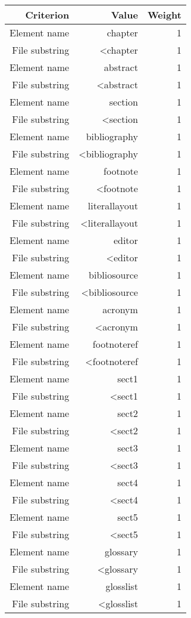 \begin{tabular}{|r|r|r|}
\hline
\bf Criterion&\bf Value&\bf Weight\\
\hline
Element name&chapter&1\\
\hline
File substring&<chapter&1\\
\hline
Element name&abstract&1\\
\hline
File substring&<abstract&1\\
\hline
Element name&section&1\\
\hline
File substring&<section&1\\
\hline
Element name&bibliography&1\\
\hline
File substring&<bibliography&1\\
\hline
Element name&footnote&1\\
\hline
File substring&<footnote&1\\
\hline
Element name&literallayout&1\\
\hline
File substring&<literallayout&1\\
\hline
Element name&editor&1\\
\hline
File substring&<editor&1\\
\hline
Element name&bibliosource&1\\
\hline
File substring&<bibliosource&1\\
\hline
Element name&acronym&1\\
\hline
File substring&<acronym&1\\
\hline
Element name&footnoteref&1\\
\hline
File substring&<footnoteref&1\\
\hline
Element name&sect1&1\\
\hline
File substring&<sect1&1\\
\hline
Element name&sect2&1\\
\hline
File substring&<sect2&1\\
\hline
Element name&sect3&1\\
\hline
File substring&<sect3&1\\
\hline
Element name&sect4&1\\
\hline
File substring&<sect4&1\\
\hline
Element name&sect5&1\\
\hline
File substring&<sect5&1\\
\hline
Element name&glossary&1\\
\hline
File substring&<glossary&1\\
\hline
Element name&glosslist&1\\
\hline
File substring&<glosslist&1\\
\hline
\end{tabular}
